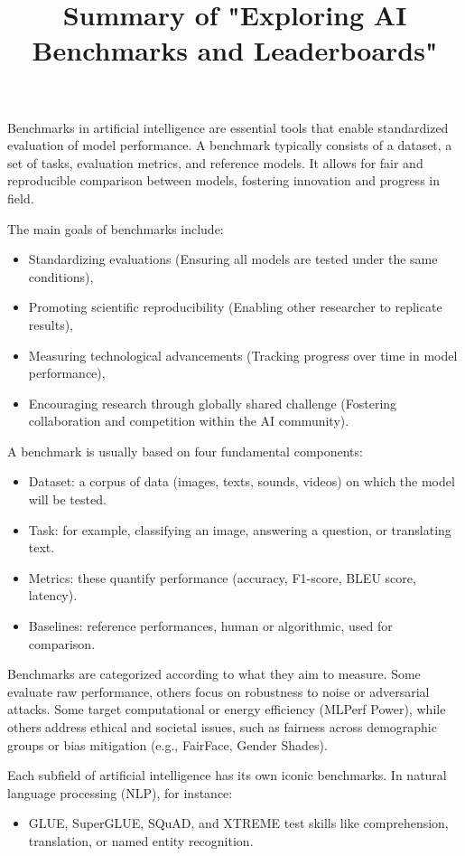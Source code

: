 \documentclass[12pt]{article}
\title{Summary of "Exploring AI Benchmarks and Leaderboards"}
\author{}
\date{}
\begin{document}
\maketitle

Benchmarks in artificial intelligence are essential tools that enable standardized evaluation of model performance. A benchmark typically consists of a dataset, a set of tasks, evaluation metrics, and reference models. It allows for fair and reproducible comparison between models, fostering innovation and progress in field.

The main goals of benchmarks include:
\begin{itemize}
  \item Standardizing evaluations (Ensuring all models are tested under the same conditions),
  \item Promoting scientific reproducibility (Enabling other researcher to replicate results),
  \item Measuring technological advancements (Tracking progress over time in model performance),
  \item Encouraging research through globally shared challenge (Fostering collaboration and competition within the AI community).
\end{itemize}

A benchmark is usually based on four fundamental components:
\begin{itemize}[topsep=2pt,itemsep=1pt]
  \item Dataset: a corpus of data (images, texts, sounds, videos) on which the model will be tested.
  \item Task: for example, classifying an image, answering a question, or translating text.
  \item Metrics: these quantify performance (accuracy, F1-score, BLEU score, latency).
  \item Baselines: reference performances, human or algorithmic, used for comparison.
\end{itemize}

Benchmarks are categorized according to what they aim to measure. Some evaluate raw performance, others focus on robustness to noise or adversarial attacks. Some target computational or energy efficiency (MLPerf Power), while others address ethical and societal issues, such as fairness across demographic groups or bias mitigation (e.g., FairFace, Gender Shades).

Each subfield of artificial intelligence has its own iconic benchmarks. In natural language processing (NLP), for instance:
\begin{itemize}[topsep=2pt,itemsep=1pt]
  \item GLUE, SuperGLUE, SQuAD, and XTREME test skills like comprehension, translation, or named entity recognition.
\end{itemize}
\end{document}
